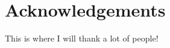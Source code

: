 \makeatletter
\renewcommand*\@makeschapterhead[1]{%
        {%
        \singlespacing\parindent\z@\raggedright\normalfont
        \interlinepenalty\@M
        \sffamily\Huge\bfseries
        #1\par
        \nobreak\vskip 20\p@
        \onehalfspacing
    }
}
\makeatother

\chapter*{Acknowledgements}

This is where I will thank a lot of people!

